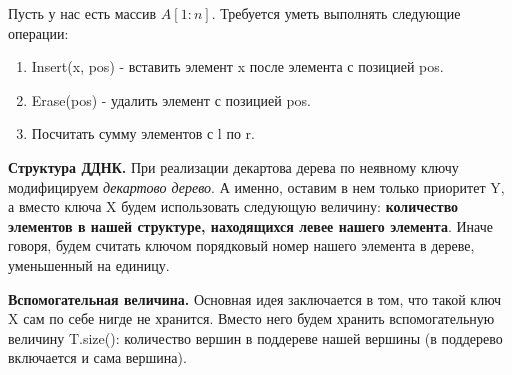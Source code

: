 \Task Пусть у нас есть массив $A[1 : n]$.
Требуется уметь выполнять следующие операции: \\

\begin{enumerate}
    \item Insert(x, pos) - вставить элемент x после элемента с позицией pos.
    \item Erase(pos) - удалить элемент с позицией pos.
    \item Посчитать сумму элементов с l по r.
\end{enumerate}

\textbf{Структура ДДНК.}
При реализации декартова дерева по неявному ключу модифицируем \textit{декартово дерево}. А именно, оставим в нем только приоритет Y, а вместо ключа X будем использовать следующую величину: \textbf{количество элементов в нашей структуре, находящихся левее нашего элемента}. Иначе говоря, будем считать ключом порядковый номер нашего элемента в дереве, уменьшенный на единицу. 

\textbf{Вспомогательная величина.}
Основная идея заключается в том, что такой ключ X сам по себе нигде не хранится. Вместо него будем хранить вспомогательную величину T.size(): количество вершин в поддереве нашей вершины (в поддерево включается и сама вершина). 

